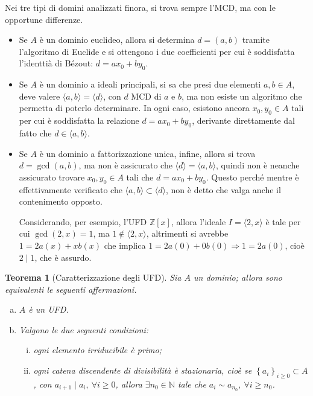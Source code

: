 \documentclass[11pt]{article}
\theoremstyle{style}
\newtheorem{teorema}{Teorema}[section]
\numberwithin{equation}{subsection}
\begin{document}
\noindent Nei tre tipi di domini analizzati finora, si trova sempre l'MCD, ma con le opportune differenze.
\begin{itemize}
	\item Se $A$ \`e un dominio euclideo, allora si determina $d = (a,b)$ tramite l'algoritmo di Euclide e si ottengono i due coefficienti per cui \`e soddisfatta l'identti\`a di B\'ezout: $d = ax_0 + by_0$.
	\item Se $A$ \`e un dominio a ideali principali, si sa che presi due elementi $a,b \in A$, deve valere $\langle a,b \rangle= \langle d \rangle$, con $d$ MCD di $a$ e $b$, ma non esiste un algoritmo che permetta di poterlo determinare.
		In ogni caso, esistono ancora $x_0,y_0 \in A$ tali per cui \`e soddisfatta la relazione $d = ax_0+by_0$, derivante direttamente dal fatto che $d \in  \langle a,b \rangle$.
	\item Se $A$ \`e un dominio a fattorizzazione unica, infine, allora si trova $d = \operatorname{gcd}(a,b) $, ma non \`e assicurato che $\langle d \rangle=\langle a,b \rangle$, quindi non \`e neanche assicurato trovare $x_0,y_0\in A$ tali che $d = ax_0+by_0$.
		Questo perch\'e mentre \`e effettivamente verificato che $\langle a,b \rangle\subset \langle d \rangle$, non \`e detto che valga anche il contenimento opposto.

			Considerando, per esempio, l'UFD $\mathbb{Z}[x]$, allora l'ideale $I = \langle 2,x \rangle$ \`e tale per cui $\operatorname{gcd}(2,x)=1$, ma $1 \not \in \langle 2,x \rangle$, altrimenti si avrebbe $1 =  2a(x) + xb(x)$ che implica $1 = 2a(0) + 0 b(0)\Rightarrow 1 = 2a(0)$, cio\`e $2  \mid 1$, che \`e assurdo.
\end{itemize}
\begin{teorema}
	[Caratterizzazione degli UFD]
	Sia $A$ un dominio; allora sono equivalenti le seguenti affermazioni.
	\begin{enumerate}[(a).]
		\item $A$ \`e un UFD.
		\item Valgono le due seguenti condizioni:
			\begin{enumerate}[(i).]
				\item ogni elemento irriducibile \`e primo;
				\item ogni catena discendente di divisibilit\`a \`e stazionaria, cio\`e se $\left\{ a_i \right\}_{i\ge 0}  \subset A$, con $a_{i+1}  \mid a_i, \ \forall i\ge 0$, allora $\exists n_0 \in \mathbb{N}$ tale che $a_i \sim a_{n_0} , \ \forall i\ge n_0$.
			\end{enumerate}
	\end{enumerate}
\end{teorema}
\end{document}
